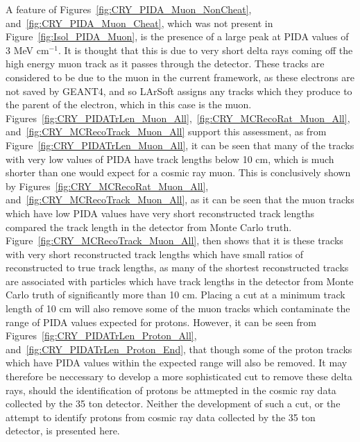 A feature of Figures~\ref{fig:CRY_PIDA_Muon_NonCheat}, and~\ref{fig:CRY_PIDA_Muon_Cheat}, which was not present in Figure~\ref{fig:Isol_PIDA_Muon}, is the presence of a large peak at PIDA values of 3 MeV cm$^{-1}$. It is thought that this is due to very short delta rays coming off the high energy muon track as it passes through the detector. These tracks are considered to be due to the muon in the current framework, as these electrons are not saved by GEANT4, and so LArSoft assigns any tracks which they produce to the parent of the electron, which in this case is the muon. Figures~\ref{fig:CRY_PIDATrLen_Muon_All},~\ref{fig:CRY_MCRecoRat_Muon_All}, and~\ref{fig:CRY_MCRecoTrack_Muon_All} support this assessment, as from Figure~\ref{fig:CRY_PIDATrLen_Muon_All}, it can be seen that many of the tracks with very low values of PIDA have track lengths below 10 cm, which is much shorter than one would expect for a cosmic ray muon. This is conclusively shown by Figures~\ref{fig:CRY_MCRecoRat_Muon_All}, and~\ref{fig:CRY_MCRecoTrack_Muon_All}, as it can be seen that the muon tracks which have low PIDA values have very short reconstructed track lengths compared the track length in the detector from Monte Carlo truth. Figure~\ref{fig:CRY_MCRecoTrack_Muon_All}, then shows that it is these tracks with very short reconstructed track lengths which have small ratios of reconstructed to true track lengths, as many of the shortest reconstructed tracks are associated with particles which have track lengths in the detector from Monte Carlo truth of significantly more than 10 cm. Placing a cut at a minimum track length of 10 cm will also remove some of the muon tracks which contaminate the range of PIDA values expected for protons. However, it can be seen from Figures~\ref{fig:CRY_PIDATrLen_Proton_All}, and~\ref{fig:CRY_PIDATrLen_Proton_End}, that though some of the proton tracks which have PIDA values within the expected range will also be removed. It may therefore be neccessary to develop a more sophisticated cut to remove these delta rays, should the identification of protons be attmepted in the cosmic ray data collected by the 35 ton detector. Neither the development of such a cut, or the attempt to identify protons from cosmic ray data collected by the 35 ton detector, is presented here. \\


